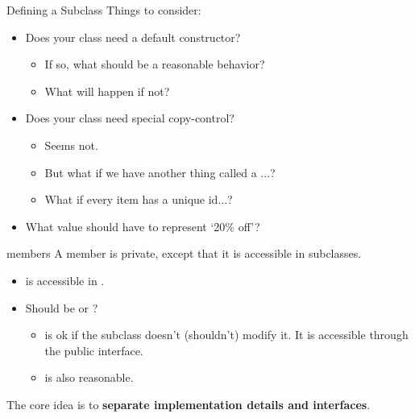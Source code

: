 \documentclass{beamer}
\begin{document}
\begin{frame}{Defining a Subclass}
    Things to consider:
    \begin{itemize}
        \item Does your class need a default constructor?
        \begin{itemize}
            \item If so, what should be a reasonable behavior?
            \item What will happen if not?
        \end{itemize}
        \item Does your class need special copy-control?
        \begin{itemize}
            \item Seems not.
            \item But what if we have another thing called a ...?
            \item What if every item has a unique id...?
        \end{itemize}
        \item What value should  have to represent `20\% off'?
    \end{itemize}
\end{frame}

\begin{frame}{ members}
    A  member is private, except that it is accessible in subclasses.
    \begin{itemize}
        \item {} is accessible in .
        \item Should  be  or ?
        \begin{itemize}
            \item \private is ok if the subclass doesn't (shouldn't) modify it. It is accessible through the public  interface.
            \item {} is also reasonable.
        \end{itemize}
    \end{itemize}
    The core idea is to \textbf{separate implementation details and interfaces}.
\end{frame}
\end{document}
